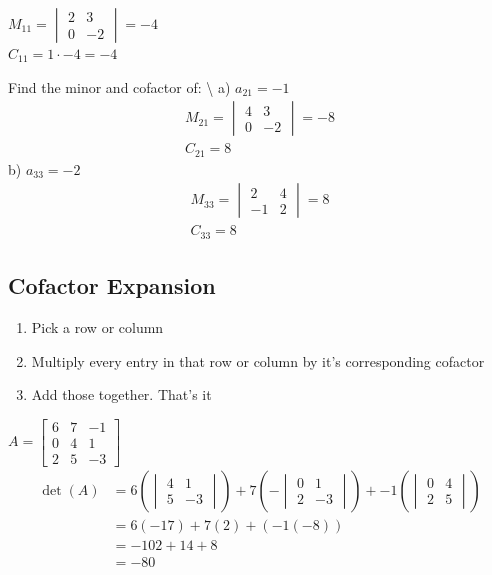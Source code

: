 \documentclass[
  letterpaper,
  DIV=11,
  numbers=noendperiod]{scrartcl}
\providecommand{\tightlist}{%
  \setlength{\itemsep}{0pt}\setlength{\parskip}{0pt}}\usepackage{longtable,booktabs,array}
\begin{document}
\(M_{11} = \begin{vmatrix}2 & 3 \\ 0 & -2\end{vmatrix} = -4\)\\
\(C_{11} = 1 \cdot -4 = -4\)

Find the minor and cofactor of: \textbackslash{} a) \(a_{21} = -1\)
\begin{align*}
M_{21} = \begin{vmatrix}4 & 3 \\ 0 & -2 \end{vmatrix} = -8 \\
C_{21} = 8
\end{align*} b) \(a_{33} = -2\) \begin{align*}
M_{33} = \begin{vmatrix}2 & 4 \\ -1 & 2 \end{vmatrix} = 8 \\
C_{33} = 8
\end{align*}

\subsection{Cofactor Expansion}\label{cofactor-expansion}

\begin{enumerate}
\def\labelenumi{\arabic{enumi})}
\tightlist
\item
  Pick a row or column
\item
  Multiply every entry in that row or column by it's corresponding
  cofactor
\item
  Add those together. That's it
\end{enumerate}

\(A = \begin{bmatrix} 6 & 7 & -1 \\ 0 & 4 & 1 \\ 2 & 5 & -3\end{bmatrix}\)
\begin{align*}
\det(A) &= 6\left(\begin{vmatrix}4 & 1 \\ 5 & -3\end{vmatrix}\right) + 7\left(-\begin{vmatrix}0 & 1 \\ 2 & -3\end{vmatrix}\right) + -1\left(\begin{vmatrix}0 & 4 \\ 2 & 5 \end{vmatrix}\right) \\
&=6(-17) + 7(2) + (-1(-8)) \\
&= -102+14+8 \\
&=-80
\end{align*}
\end{document}
